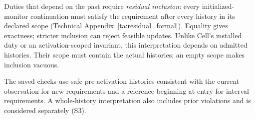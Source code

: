 Duties that depend on the past require \emph{residual inclusion}: every initialized-monitor continuation must satisfy the requirement after every history in its declared scope (Technical Appendix~\ref{ta:residual_formal}). Equality gives exactness; stricter inclusion can reject feasible updates. Unlike Cell's installed duty or an activation-scoped invariant, this interpretation depends on admitted histories. Their scope must contain the actual histories; an empty scope makes inclusion vacuous.

The saved checks use safe pre-activation histories consistent with the current observation for new requirements and a reference beginning at entry for interval requirements. A whole-history interpretation also includes prior violations and is considered separately (S3).
